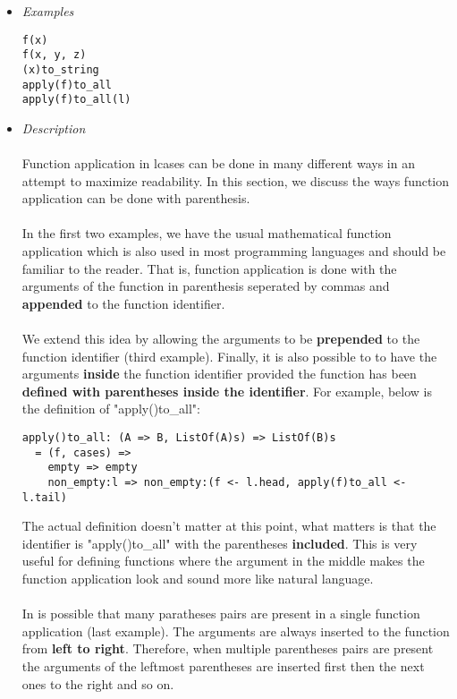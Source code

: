 \documentclass{article}
\begin{document}
\begin{itemize}
\item \textit{Examples}

\begin{verbatim}
f(x)
f(x, y, z)
(x)to_string
apply(f)to_all
apply(f)to_all(l)
\end{verbatim}

\item \textit{Description}
\\\\
Function application in lcases can be done in many different ways in an attempt to 
maximize readability. In this section, we discuss the ways function application can
be done with parenthesis.
\\\\
In the first two examples, we have the usual mathematical
function application which is also used in most programming languages and
should be familiar to the reader. That is, function application is done with the 
arguments of the function in parenthesis seperated by commas and \textbf{appended}
to the function identifier.
\\\\
We extend this idea by allowing the arguments to be \textbf{prepended} to the
function identifier (third example). Finally, it is also possible to to have
the arguments \textbf{inside} the function identifier provided the function has
been \textbf{defined with parentheses inside the identifier}. For example,
below is the definition of "apply()to\_all":

\begin{verbatim}
apply()to_all: (A => B, ListOf(A)s) => ListOf(B)s
  = (f, cases) =>
    empty => empty
    non_empty:l => non_empty:(f <- l.head, apply(f)to_all <- l.tail)
\end{verbatim}
The actual definition doesn't matter at this point, what matters is that the 
identifier is "apply()to\_all" with the parentheses \textbf{included}. This is very
useful for defining functions where the argument in the middle makes the function
application look and sound more like natural language.
\\\\
In is possible that many paratheses pairs are present in a single function
application (last example). The arguments are always inserted to the function
from \textbf{left to right}.  Therefore, when multiple parentheses pairs are
present the arguments of the leftmost parentheses are inserted first then the
next ones to the right and so on.


\end{itemize}
\end{document}
